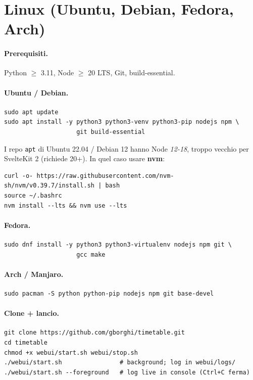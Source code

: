 \section{Linux (Ubuntu, Debian, Fedora, Arch)}

\paragraph{Prerequisiti.} Python $\geq$ 3.11, Node $\geq$ 20 LTS,
Git, build-essential.

\paragraph{Ubuntu / Debian.}
\begin{lstlisting}[style=shell]
sudo apt update
sudo apt install -y python3 python3-venv python3-pip nodejs npm \
                    git build-essential
\end{lstlisting}

I repo \texttt{apt} di Ubuntu 22.04 / Debian 12 hanno Node \emph{12-18},
troppo vecchio per SvelteKit 2 (richiede 20+). In quel caso usare
\textbf{nvm}:
\begin{lstlisting}[style=shell]
curl -o- https://raw.githubusercontent.com/nvm-sh/nvm/v0.39.7/install.sh | bash
source ~/.bashrc
nvm install --lts && nvm use --lts
\end{lstlisting}

\paragraph{Fedora.}
\begin{lstlisting}[style=shell]
sudo dnf install -y python3 python3-virtualenv nodejs npm git \
                    gcc make
\end{lstlisting}

\paragraph{Arch / Manjaro.}
\begin{lstlisting}[style=shell]
sudo pacman -S python python-pip nodejs npm git base-devel
\end{lstlisting}

\paragraph{Clone + lancio.}
\begin{lstlisting}[style=shell]
git clone https://github.com/gborghi/timetable.git
cd timetable
chmod +x webui/start.sh webui/stop.sh
./webui/start.sh                # background; log in webui/logs/
./webui/start.sh --foreground   # log live in console (Ctrl+C ferma)
\end{lstlisting}

